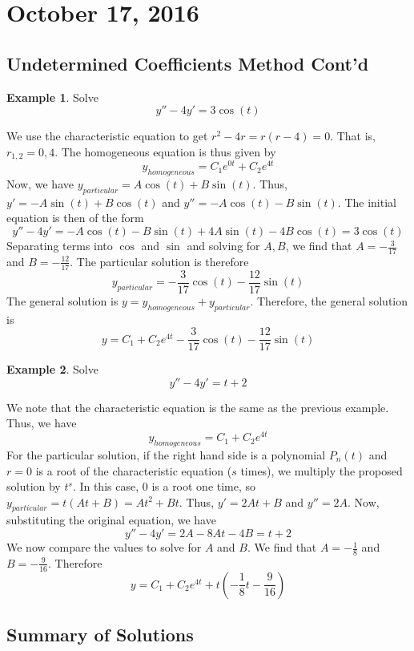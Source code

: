 \documentclass[11pt]{article}
\theoremstyle{plain} %
\theoremstyle{definition}
\theoremstyle{example}
\newtheorem*{example}{Example}
\theoremstyle{remark}
\begin{document}
\section{October 17, 2016}
\subsection{Undetermined Coefficients Method Cont'd}

\begin{example}
Solve $$y'' -4y'=3\cos(t)$$
\end{example}

We use the characteristic equation to get $r^2-4r=r(r-4) = 0$. That is, $r_{1,2} = 0, 4$. The homogeneous equation is thus given by $$y_{homogeneous} = C_1e^{0t} + C_2e^{4t}$$
Now, we have $y_{particular} = A\cos(t) + B\sin(t)$. Thus, $y' = -A\sin(t) + B\cos(t)$ and $y'' = -A\cos(t) -B\sin(t)$. The initial equation is then of the form $$y'' -4y'  = -A\cos(t)-B\sin(t) + 4A\sin(t) -4B\cos(t) = 3\cos(t)$$ Separating terms into $\cos$ and $\sin$ and solving for $A,B$, we find that $A = -\frac{3}{17}$ and $B = -\frac{12}{17}$. The particular solution is therefore $$y_{particular} = -\frac{3}{17}\cos(t) -\frac{12}{17}\sin(t)$$ The general solution is $y = y_{homogeneous} + y_{particular}$. Therefore, the general solution is $$y = C_1 + C_2e^{4t} -\frac{3}{17}\cos(t) - \frac{12}{17}\sin(t)$$

\begin{example}
Solve $$y'' -4y' = t+2$$
\end{example}

We note that the characteristic equation is the same as the previous example. Thus, we have $$y_{homogeneous} = C_1 + C_2e^{4t}$$ For the particular solution, if the right hand side is a polynomial $P_n(t)$ and $r = 0$ is a root of the characteristic equation ($s$ times), we multiply the proposed solution by $t^s$. In this case, $0$ is a root one time, so $y_{particular} = t(At+B) = At^2+Bt$. Thus, $y' = 2At + B$ and $y'' = 2A$. Now, substituting the original equation, we have $$y'' -4y' = 2A-8At -4B = t+2$$ We now compare the values to solve for $A$ and $B$. We find that $A  = -\frac{1}{8}$ and $B = -\frac{9}{16}$. Therefore $$y = C_1 + C_2e^{4t} +t\left(-\frac{1}{8}t - \frac{9}{16}\right)$$

\subsection{Summary of Solutions}
\end{document}
